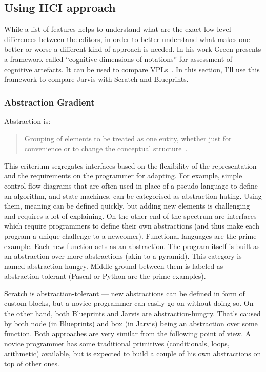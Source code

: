 \documentclass[11pt]{scrartcl}
\begin{document}
\subsection{Using HCI approach}
While a list of features helps to understand what are the exact low-level
differences between the editors, in order to better understand what makes one
better or worse a different kind of approach is needed.
In his work Green presents a framework called “cognitive dimensions
of notations” for assessment of cognitive artefacts.
It can be used to compare VPLs~\cite{Green96UsabilityAnalysis}. In this section,
I’ll use this framework to compare Jarvis with Scratch and Blueprints.

\subsubsection{Abstraction Gradient}
Abstraction is:
\blockquote{Grouping of elements to be
  treated as one entity, whether just for convenience or to change the
  conceptual structure~\cite{Green96UsabilityAnalysis}.}
This criterium segregates interfaces based on the flexibility of the
representation and the requirements on the programmer for adapting.
For example, simple control flow diagrams that are often used in place of a
pseudo-language to define an algorithm, and state machines, can be categorised
as abstraction-hating.
Using them, meaning can be defined quickly, but adding new elements is
challenging and requires a lot of explaining.
On the other end of the spectrum are interfaces which require programmers to
define their own abstractions (and thus make each program a unique challenge to
a newcomer).
Functional languages are the prime example.
Each new function acts as an abstraction.
The program itself is built as an abstraction over more abstractions (akin to a
pyramid).
This category is named abstraction-hungry.
Middle-ground between them is labeled as abstraction-tolerant (Pascal or Python
are the prime examples).

Scratch is abstraction-tolerant --- new abstractions can be defined in form of
custom blocks, but a novice programmer can easily go on without doing so.
On the other hand, both Blueprints and Jarvis are abstraction-hungry.
That’s caused by both node (in Blueprints) and box (in Jarvis) being an
abstraction over some function.
Both approaches are very similar from the following point of view.
A novice programmer has some traditional primitives (conditionals, loops,
arithmetic) available, but is expected to build a couple of his own abstractions
on top of other ones.
\end{document}
